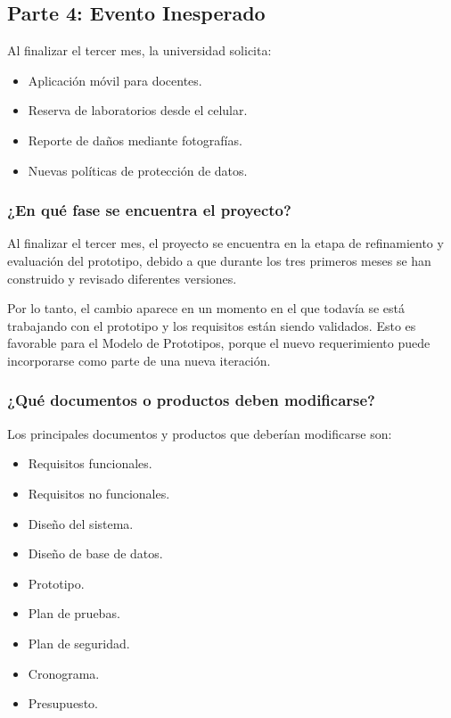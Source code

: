 \documentclass[pdflatex,sn-mathphys-num]{sn-jnl}%
\theoremstyle{thmstyleone}%
\theoremstyle{thmstyletwo}%
\theoremstyle{thmstylethree}%
\begin{document}
 \subsection{Parte 4: Evento Inesperado}
 
 Al finalizar el tercer mes, la universidad solicita:
 
 \begin{itemize}
 	\item Aplicación móvil para docentes.
 	\item Reserva de laboratorios desde el celular.
 	\item Reporte de daños mediante fotografías.
 	\item Nuevas políticas de protección de datos.
 \end{itemize}
 
 
 \subsubsection{¿En qué fase se encuentra el proyecto?}
 
 Al finalizar el tercer mes, el proyecto se encuentra en la etapa de refinamiento y evaluación del prototipo, debido a que durante los tres primeros meses se han construido y revisado diferentes versiones.
 
 Por lo tanto, el cambio aparece en un momento en el que todavía se está trabajando con el prototipo y los requisitos están siendo validados. Esto es favorable para el Modelo de Prototipos, porque el nuevo requerimiento puede incorporarse como parte de una nueva iteración.
 
 
 \subsubsection{¿Qué documentos o productos deben modificarse?}
 
 Los principales documentos y productos que deberían modificarse son:
 
 \begin{itemize}
 	\item Requisitos funcionales.
 	\item Requisitos no funcionales.
 	\item Diseño del sistema.
 	\item Diseño de base de datos.
 	\item Prototipo.
 	\item Plan de pruebas.
 	\item Plan de seguridad.
 	\item Cronograma.
 	\item Presupuesto.
 \end{itemize}
 
\end{document}
